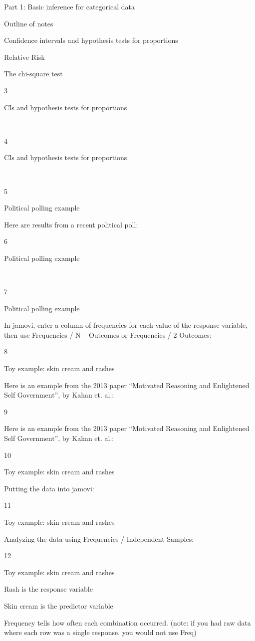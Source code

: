 \documentclass[
  letterpaper,
  DIV=11,
  numbers=noendperiod]{scrreprt}
\begin{document}
Part 1: Basic inference for categorical data

Outline of notes

Confidence intervals and hypothesis tests for proportions

Relative Risk

The chi-square test

3

CIs and hypothesis tests for proportions

~

4

CIs and hypothesis tests for proportions

~

5

Political polling example

Here are results from a recent political poll:

6

Political polling example

~

7

Political polling example

In jamovi, enter a column of frequencies for each value of the response
variable, then use Frequencies / N -- Outcomes or Frequencies / 2
Outcomes:



8

Toy example: skin cream and rashes

Here is an example from the 2013 paper ``Motivated Reasoning and
Enlightened Self Government'', by Kahan et. al.:

9

Here is an example from the 2013 paper ``Motivated Reasoning and
Enlightened Self Government'', by Kahan et. al.:

10

Toy example: skin cream and rashes

Putting the data into jamovi:

11

Toy example: skin cream and rashes

Analyzing the data using Frequencies / Independent Samples:

12

Toy example: skin cream and rashes

Rash is the response variable

Skin cream is the predictor variable

Frequency tells how often each combination occurred. (note: if you had
raw data where each row was a single response, you would not use Freq)
\end{document}
